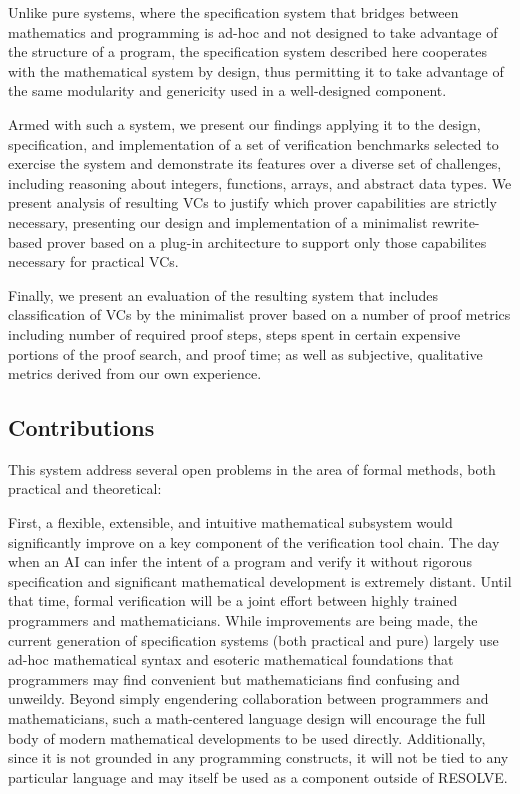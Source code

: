 Unlike pure systems, where the specification system that bridges between mathematics and programming is ad-hoc and not designed to take advantage of the structure of a program, the specification system described here cooperates with the mathematical system by design, thus permitting it to take advantage of the same modularity and genericity used in a well-designed component.

Armed with such a system, we present our findings applying it to the design, specification, and implementation of a set of verification benchmarks selected to exercise the system and demonstrate its features over a diverse set of challenges, including reasoning about integers, functions, arrays, and abstract data types.  We present analysis of resulting VCs to justify which prover capabilities are strictly necessary, presenting our design and implementation of a minimalist rewrite-based prover based on a plug-in architecture to support only those capabilites necessary for practical VCs.

Finally, we present an evaluation of the resulting system that includes classification of VCs by the minimalist prover based on a number of proof metrics including number of required proof steps, steps spent in certain expensive portions of the proof search, and proof time; as well as subjective, qualitative metrics derived from our own experience.

\subsection{Contributions\label{sec:contributions}}
This system address several open problems in the area of formal methods, both practical and theoretical:

First, a flexible, extensible, and intuitive mathematical subsystem would significantly improve on a key component of the verification tool chain.  The day when an AI can infer the intent of a program and verify it without rigorous specification and significant mathematical development is extremely distant.  Until that time, formal verification will be a joint effort between highly trained programmers and mathematicians.  While improvements are being made\cite{wenzelIsar}, the current generation of specification systems (both practical and pure) largely use ad-hoc mathematical syntax and esoteric mathematical foundations that programmers may find convenient but mathematicians find confusing and unweildy.  Beyond simply engendering collaboration between programmers and mathematicians, such a math-centered language design will encourage the full body of modern mathematical developments to be used directly.  Additionally, since it is not grounded in any programming constructs, it will not be tied to any particular language and may itself be used as a component outside of RESOLVE.

